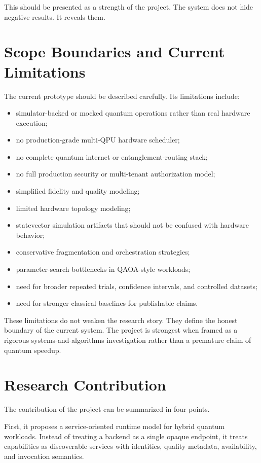 \documentclass[11pt]{article}
\begin{document}
This should be presented as a strength of the project. The system does not hide negative results. It reveals them.

\section{Scope Boundaries and Current Limitations}

The current prototype should be described carefully. Its limitations include:

\begin{itemize}
\item simulator-backed or mocked quantum operations rather than real hardware execution;
\item no production-grade multi-QPU hardware scheduler;
\item no complete quantum internet or entanglement-routing stack;
\item no full production security or multi-tenant authorization model;
\item simplified fidelity and quality modeling;
\item limited hardware topology modeling;
\item statevector simulation artifacts that should not be confused with hardware behavior;
\item conservative fragmentation and orchestration strategies;
\item parameter-search bottlenecks in QAOA-style workloads;
\item need for broader repeated trials, confidence intervals, and controlled datasets;
\item need for stronger classical baselines for publishable claims.
\end{itemize}

These limitations do not weaken the research story. They define the honest boundary of the current system. The project is strongest when framed as a rigorous systems-and-algorithms investigation rather than a premature claim of quantum speedup.

\section{Research Contribution}

The contribution of the project can be summarized in four points.

First, it proposes a service-oriented runtime model for hybrid quantum workloads. Instead of treating a backend as a single opaque endpoint, it treats capabilities as discoverable services with identities, quality metadata, availability, and invocation semantics.
\end{document}
